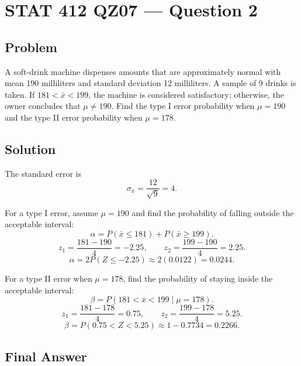 \documentclass[11pt]{article}
\begin{document}
\section*{STAT 412 QZ07 --- Question 2}

\subsection*{Problem}

A soft-drink machine dispenses amounts that are approximately normal with mean 190 milliliters and standard deviation 12 milliliters. A sample of 9 drinks is taken. If $181<\bar{x}<199$, the machine is considered satisfactory; otherwise, the owner concludes that $\mu\ne190$. Find the type I error probability when $\mu=190$ and the type II error probability when $\mu=178$.

\subsection*{Solution}

The standard error is
\[
\sigma_{\bar{x}}=\frac{12}{\sqrt{9}}=4.
\]

For a type I error, assume $\mu=190$ and find the probability of falling outside the acceptable interval:
\[
\alpha=P(\bar{x}\le181)+P(\bar{x}\ge199).
\]
\[
z_1=\frac{181-190}{4}=-2.25,\qquad z_2=\frac{199-190}{4}=2.25.
\]
\[
\alpha=2P(Z\le -2.25)\approx 2(0.0122)=0.0244.
\]

For a type II error when $\mu=178$, find the probability of staying inside the acceptable interval:
\[
\beta=P(181<\bar{x}<199\mid \mu=178).
\]
\[
z_1=\frac{181-178}{4}=0.75,\qquad z_2=\frac{199-178}{4}=5.25.
\]
\[
\beta=P(0.75<Z<5.25)\approx 1-0.7734=0.2266.
\]

\subsection*{Final Answer}

\end{document}
